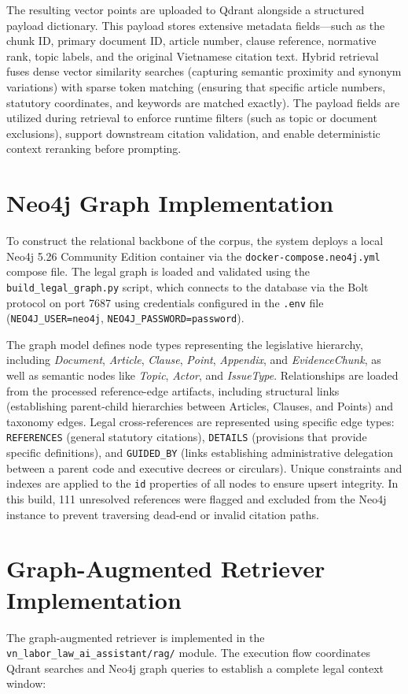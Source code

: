 The resulting vector points are uploaded to Qdrant alongside a structured payload dictionary. This payload stores extensive metadata fields—such as the chunk ID, primary document ID, article number, clause reference, normative rank, topic labels, and the original Vietnamese citation text. Hybrid retrieval fuses dense vector similarity searches (capturing semantic proximity and synonym variations) with sparse token matching (ensuring that specific article numbers, statutory coordinates, and keywords are matched exactly). The payload fields are utilized during retrieval to enforce runtime filters (such as topic or document exclusions), support downstream citation validation, and enable deterministic context reranking before prompting.

\section{Neo4j Graph Implementation}
To construct the relational backbone of the corpus, the system deploys a local Neo4j 5.26 Community Edition container via the \texttt{docker-compose.neo4j.yml} compose file. The legal graph is loaded and validated using the \texttt{build\_legal\_graph.py} script, which connects to the database via the Bolt protocol on port 7687 using credentials configured in the \texttt{.env} file (\texttt{NEO4J\_USER=neo4j}, \texttt{NEO4J\_PASSWORD=password}).

The graph model defines node types representing the legislative hierarchy, including \textit{Document}, \textit{Article}, \textit{Clause}, \textit{Point}, \textit{Appendix}, and \textit{EvidenceChunk}, as well as semantic nodes like \textit{Topic}, \textit{Actor}, and \textit{IssueType}. Relationships are loaded from the processed reference-edge artifacts, including structural links (establishing parent-child hierarchies between Articles, Clauses, and Points) and taxonomy edges. Legal cross-references are represented using specific edge types: \texttt{REFERENCES} (general statutory citations), \texttt{DETAILS} (provisions that provide specific definitions), and \texttt{GUIDED\_BY} (links establishing administrative delegation between a parent code and executive decrees or circulars). Unique constraints and indexes are applied to the \texttt{id} properties of all nodes to ensure upsert integrity. In this build, 111 unresolved references were flagged and excluded from the Neo4j instance to prevent traversing dead-end or invalid citation paths.

\section{Graph-Augmented Retriever Implementation}
The graph-augmented retriever is implemented in the \texttt{vn\_labor\_law\_ai\_assistant/\allowbreak{}rag/} module. The execution flow coordinates Qdrant searches and Neo4j graph queries to establish a complete legal context window:

